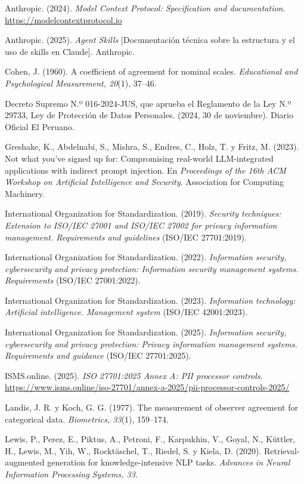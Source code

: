 \documentclass[12pt,letterpaper]{article}
\newenvironment{referencias}{%
  \par\begingroup\setlength{\parindent}{0pt}\RaggedRight%
  \everypar{\hangindent=1.27cm\hangafter=1}%
  \setlength{\parskip}{6pt}}{\par\endgroup}
\begin{document}
\begin{referencias}
Anthropic. (2024). \textit{Model Context Protocol: Specification and documentation}. \url{https://modelcontextprotocol.io}

Anthropic. (2025). \textit{Agent Skills} [Documentación técnica sobre la estructura y el uso de skills en Claude]. Anthropic.

Cohen, J. (1960). A coefficient of agreement for nominal scales. \textit{Educational and Psychological Measurement, 20}(1), 37--46.

Decreto Supremo N.º 016-2024-JUS, que aprueba el Reglamento de la Ley N.º 29733, Ley de Protección de Datos Personales. (2024, 30 de noviembre). Diario Oficial El Peruano.

Greshake, K., Abdelnabi, S., Mishra, S., Endres, C., Holz, T. y Fritz, M. (2023). Not what you've signed up for: Compromising real-world LLM-integrated applications with indirect prompt injection. En \textit{Proceedings of the 16th ACM Workshop on Artificial Intelligence and Security}. Association for Computing Machinery.

International Organization for Standardization. (2019). \textit{Security techniques: Extension to ISO/IEC 27001 and ISO/IEC 27002 for privacy information management. Requirements and guidelines} (ISO/IEC 27701:2019).

International Organization for Standardization. (2022). \textit{Information security, cybersecurity and privacy protection: Information security management systems. Requirements} (ISO/IEC 27001:2022).

International Organization for Standardization. (2023). \textit{Information technology: Artificial intelligence. Management system} (ISO/IEC 42001:2023).

International Organization for Standardization. (2025). \textit{Information security, cybersecurity and privacy protection: Privacy information management systems. Requirements and guidance} (ISO/IEC 27701:2025).

ISMS.online. (2025). \textit{ISO 27701:2025 Annex A: PII processor controls}. \url{https://www.isms.online/iso-27701/annex-a-2025/pii-processor-controls-2025/}

Landis, J. R. y Koch, G. G. (1977). The measurement of observer agreement for categorical data. \textit{Biometrics, 33}(1), 159--174.

Lewis, P., Perez, E., Piktus, A., Petroni, F., Karpukhin, V., Goyal, N., Küttler, H., Lewis, M., Yih, W., Rocktäschel, T., Riedel, S. y Kiela, D. (2020). Retrieval-augmented generation for knowledge-intensive NLP tasks. \textit{Advances in Neural Information Processing Systems, 33}.


\end{referencias}
\end{document}
